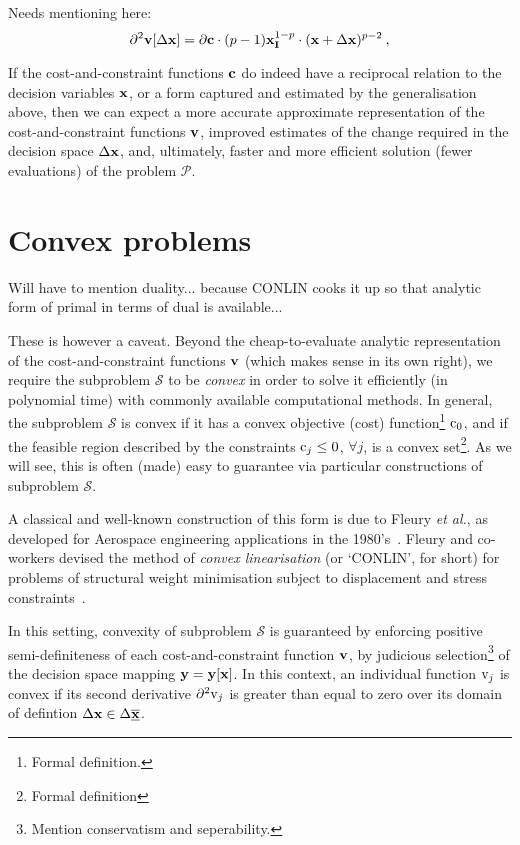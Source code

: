\documentclass[11pt]{article}
\begin{document}
Needs mentioning here:
\begin{equation}
\label{eq:d2p}
\partial^2 \mathbf{v}[\Delta \mathbf{x}] = \partial \mathbf{c} \cdot (p-1)\mathbf{x}_{\mathbf{I}}^{1-p} \cdot (\mathbf{x}+\Delta\mathbf{x})^{p-2} \: ,
\end{equation}

If the cost-and-constraint functions $\mathbf{c}$ do indeed have a reciprocal relation to the decision variables $\mathbf{x}$, or a form captured and estimated by the generalisation above, then we can expect a more accurate approximate representation of the cost-and-constraint functions $\mathbf{v}$, improved estimates of the change required in the decision space $\Delta \mathbf{x}$, and, ultimately, faster and more efficient solution (fewer evaluations) of the problem $\mathcal{P}$.

\section{Convex problems}

Will have to mention duality... because CONLIN cooks it up so that analytic form of primal in terms of dual is available... 

These is however a caveat. Beyond the cheap-to-evaluate analytic representation of the cost-and-constraint functions $\mathbf{v}$ (which makes sense in its own right), we require the subproblem $\mathcal{S}$ to be \emph{convex} in order to solve it efficiently (in polynomial time) with commonly available computational methods. In general, the subproblem $\mathcal{S}$ is convex if it has a convex objective (cost) function\footnote{Formal definition.} $\textrm{c}_0$, and if the feasible region described by the constraints $\textrm{c}_j \le 0$, $\forall j$, is a convex set\footnote{Formal definition}. As we will see, this is often (made) easy to guarantee via particular constructions of subproblem $\mathcal{S}$.

A classical and well-known construction of this form is due to Fleury \emph{et al.}, as developed for Aerospace engineering applications in the 1980's~\cite{fleury1986structural}. Fleury and co-workers devised the method of \emph{convex linearisation} (or `CONLIN', for short) for problems of structural weight minimisation subject to displacement and stress constraints~\cite{fleury1989conlin}. 

In this setting, convexity of subproblem $\mathcal{S}$ is guaranteed by enforcing positive semi-definiteness of each cost-and-constraint function $\mathbf{v}$, by judicious selection\footnote{Mention conservatism and seperability.} of the decision space mapping $\mathbf{y} = \mathbf{y}[\mathbf{x}]$. In this context, an individual function $\textrm{v}_j$ is convex if its second derivative $\partial^2\textrm{v}_j$ is greater than equal to zero over its domain of defintion $\Delta \mathbf{x} \in \Delta \underline{\overline{\mathbf{x}}}$. 
\end{document}
